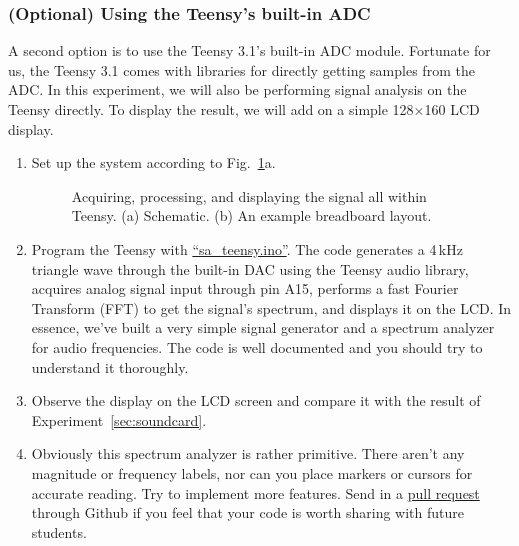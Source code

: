 \documentclass[letterpaper, 11pt]{article}
\begin{document}
\subsubsection{(Optional) Using the Teensy's built-in ADC}
\label{sec:teensy-sa}

A second option is to use the Teensy 3.1's built-in ADC module. Fortunate for us, the Teensy 3.1 comes with libraries for directly getting samples from the ADC. In this experiment, we will also be performing signal analysis on the Teensy directly. To display the result, we will add on a simple 128$\times$160 LCD display. 

\begin{enumerate}
	\item Set up the system according to Fig.~\ref{fig:audio-2}a.
			\begin{figure}[hp]
				\caption{Acquiring, processing, and displaying the signal all within Teensy. (a) Schematic. (b) An example breadboard layout.}
				\label{fig:audio-2}
			\end{figure}
			
	\item Program the Teensy with \href{https://github.com/ucdart/UCD-EEC134/blob/master/labs/lab1/code/sa_teensy/sa_teensy.ino}{``sa\_teensy.ino''}. The code generates a 4\,kHz triangle wave through the built-in DAC using the Teensy audio library,  acquires analog signal input through pin A15, performs a fast Fourier Transform (FFT) to get the signal's spectrum, and displays it on the LCD. In essence, we've built a very simple signal generator and a spectrum analyzer for audio frequencies. The code is well documented and you should try to understand it thoroughly. 
	
	\item Observe the display on the LCD screen and compare it with the result of Experiment~\ref{sec:soundcard}.
	
	\item Obviously this spectrum analyzer is rather primitive. There aren't any magnitude or frequency labels, nor can you place markers or cursors for accurate reading. Try to implement more features. Send in a \href{https://help.github.com/articles/using-pull-requests/}{pull request} through Github if you feel that your code is worth sharing with future students. 
	
\end{enumerate}
\end{document}
